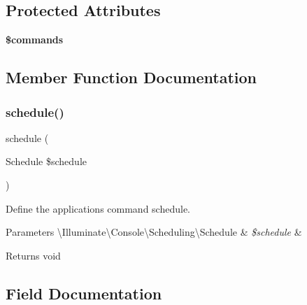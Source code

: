 \subsection*{Protected Attributes}
\begin{DoxyCompactItemize}
\item 
{\bfseries \$commands}
\end{DoxyCompactItemize}


\subsection{Member Function Documentation}
\mbox{\label{class_app_1_1_console_1_1_kernel_ac8f0af578c80277b7a25381c6a9e268c}} 
\subsubsection{\texorpdfstring{schedule()}{schedule()}}
{\footnotesize\ttfamily schedule (\begin{DoxyParamCaption}\item[{Schedule}]{\$schedule }\end{DoxyParamCaption})\hspace{0.3cm}{\ttfamily [protected]}}

Define the application\textquotesingle{}s command schedule.


\begin{DoxyParams}[1]{Parameters}
\textbackslash{}\+Illuminate\textbackslash{}\+Console\textbackslash{}\+Scheduling\textbackslash{}\+Schedule & {\em \$schedule} & \\
\hline
\end{DoxyParams}
\begin{DoxyReturn}{Returns}
void 
\end{DoxyReturn}


\subsection{Field Documentation}
\mbox{\label{class_app_1_1_console_1_1_kernel_ab63cd62b3b65fd223b6f3d57b6ca754d}} 

